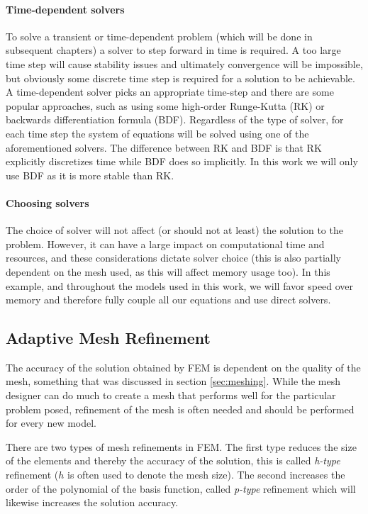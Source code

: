 \paragraph{Time-dependent solvers}

To solve a transient or time-dependent problem (which will be done in subsequent chapters) a solver to step forward in time is required.
A too large time step will cause stability issues and ultimately convergence will be impossible, but obviously some discrete time step is required for a solution to be achievable.
A time-dependent solver picks an appropriate time-step and there are some popular approaches, such as using some high-order Runge-Kutta (RK) or backwards differentiation formula (BDF).
Regardless of the type of solver, for each time step the system of equations will be solved using one of the aforementioned solvers.
The difference between RK and BDF is that RK explicitly discretizes time while BDF does so implicitly.
In this work we will only use BDF as it is more stable than RK.\par

\paragraph{Choosing solvers}

The choice of solver will not affect (or should not at least) the solution to the problem.
However, it can have a large impact on computational time and resources, and these considerations dictate solver choice (this is also partially dependent on the mesh used, as this will affect memory usage too).
In this example, and throughout the models used in this work, we will favor speed over memory and therefore fully couple all our equations and use direct solvers.\par

\subsection{Adaptive Mesh Refinement}

The accuracy of the solution obtained by FEM is dependent on the quality of the mesh, something that was discussed in section \ref{sec:meshing}.
While the mesh designer can do much to create a mesh that performs well for the particular problem posed, refinement of the mesh is often needed and should be performed for every new model.\par

There are two types of mesh refinements in FEM.
The first type reduces the size of the elements and thereby the accuracy of the solution, this is called \textit{h-type} refinement ($h$ is often used to denote the mesh size).
The second increases the order of the polynomial of the basis function, called \textit{p-type} refinement which will likewise increases the solution accuracy.\par

